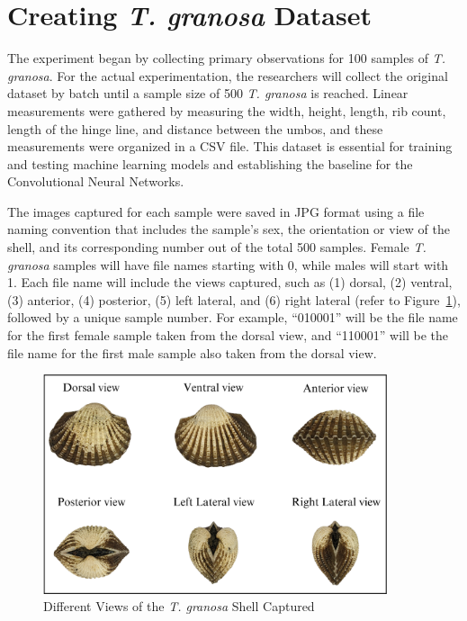 \section{Creating \textit{T. granosa} Dataset}
\label{sec:dataset}

The experiment began by collecting primary observations for 100 samples of \textit{T. granosa}. For the actual experimentation, the researchers will collect the original dataset by batch until a sample size of 500  \textit{T. granosa} is reached. Linear measurements were gathered by measuring the width, height, length, rib count, length of the hinge line, and distance between the umbos, and these measurements were organized in a CSV file. This dataset is essential for training and testing machine learning models and establishing the baseline for the Convolutional Neural Networks.

The images captured for each sample were saved in JPG format using a file naming convention that includes the sample's sex, the orientation or view of the shell, and its corresponding number out of the total 500 samples. Female \textit{T. granosa} samples will have file names starting with 0, while males will start with 1. Each file name will include the views captured, such as (1) dorsal, (2) ventral, (3) anterior, (4) posterior, (5) left lateral, and (6) right lateral (refer to Figure~\ref{fig:granosa_views}), followed by a unique sample number. For example, “010001” will be the file name for the first female sample taken from the dorsal view, and “110001” will be the file name for the first male sample also taken from the dorsal view. 

\begin{figure}[!htbp]
	\centering
	\includegraphics[width=0.9\textwidth]{figures/view.png}
	\caption{Different Views of the \textit{T. granosa} Shell Captured}
	\label{fig:granosa_views}
\end{figure}

